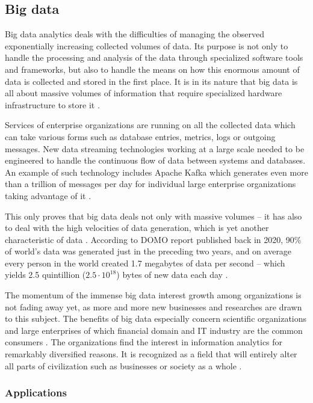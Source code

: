 \documentclass[a4paper,twoside,12pt]{book}
\begin{document}
\subsection{Big data}

Big data analytics deals with the difficulties of managing the observed exponentially increasing collected volumes of data. Its purpose is not only to handle the processing and analysis of the data through specialized software tools and frameworks, but also to handle the means on how this enormous amount of data is collected and stored in the first place. It is in its nature that big data is all about massive volumes of information that require specialized hardware infrastructure to store it \cite{bib:big_data_analytics}.

Services of enterprise organizations are running on all the collected data which can take various forms such as database entries, metrics, logs or outgoing messages. New data streaming technologies working at a large scale needed to be engineered to handle the continuous flow of data between systems and databases. An example of such technology includes Apache Kafka which generates even more than a trillion of messages per day for individual large enterprise organizations taking advantage of it \cite{bib:kafka_online,bib:kafka}.

This only proves that big data deals not only with massive volumes – it has also to deal with the high velocities of data generation, which is yet another characteristic of data \cite{bib:big_data_analytics}. According to DOMO report published back in 2020, 90\% of world's data was generated just in the preceding two years, and on average every person in the world created 1.7 megabytes of data per second – which yields 2.5 quintillion ($2.5 \cdot 10^{18}$) bytes of new data each day \cite{bib:domo}.

The momentum of the immense big data interest growth among organizations is not fading away yet, as more and more new businesses and researches are drawn to this subject. The benefits of big data especially concern scientific organizations and large enterprises of which financial domain and IT industry are the common consumers \cite{bib:anonymization_chaos}. The organizations find the interest in information analytics for remarkably diversified reasons. It is recognized as a field that will entirely alter all parts of civilization such as businesses or society as a whole \cite{bib:big_data_in_practice}.

\subsubsection{Applications}
\end{document}
